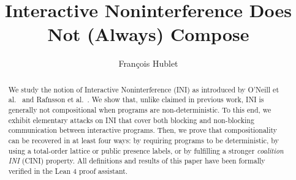 \documentclass[preprint,5p,twocolumn]{elsarticle}
\begin{document}
\begin{frontmatter}



\title{Interactive Noninterference Does Not (Always) Compose}


\author[inst1]{François Hublet}

\begin{abstract}
  We study the notion of Interactive Noninterference (INI) as introduced by
  O'Neill et al.~\cite{ONeill2006} and Rafnsson et al.~\cite{Rafnsson2012}.
  We show that, unlike claimed in previous work, INI is generally not compositional when
  programs are non-deterministic. To this end, we exhibit elementary attacks on INI that cover
  both blocking and non-blocking communication between interactive programs. Then, we
  prove that compositionality can be recovered in at least four ways:
  by requiring programs to be deterministic,
  by using a total-order lattice or public presence labels, or by fulfilling a stronger \emph{coalition INI} (CINI)
  property. All definitions and results of this paper have been formally verified in the Lean 4 proof assistant.
\end{abstract}


\end{frontmatter}
\end{document}
